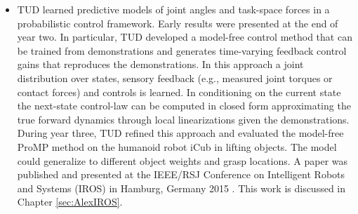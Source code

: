 \documentclass[12pt,a4paper,twoside]{report}
\begin{document}
\begin{itemize}

\item TUD learned predictive models of joint angles and task-space forces in a probabilistic control framework. 
Early results were presented at the end of year two. In particular, TUD developed a model-free control method that can be
trained from demonstrations and generates time-varying feedback control gains that reproduces
the demonstrations. In this approach a joint distribution over states, sensory feedback (e.g.,
measured joint torques or contact forces) and controls is learned. In conditioning on the
current state the next-state control-law can be computed in closed form approximating the
true forward dynamics through local linearizations given the demonstrations. During year three, TUD refined this approach 
and evaluated the model-free ProMP method on the humanoid robot iCub in lifting objects. The model could generalize to 
different object weights and grasp locations. A paper was published and presented at the IEEE/RSJ Conference on Intelligent Robots and Systems (IROS) in Hamburg, Germany 2015 \cite{Paraschos_IROS_2015}. 
This work is discussed in Chapter \ref{sec:AlexIROS}. 

% 

% 

% 
% 
% 
% 
% 

\end{itemize}
\end{document}

